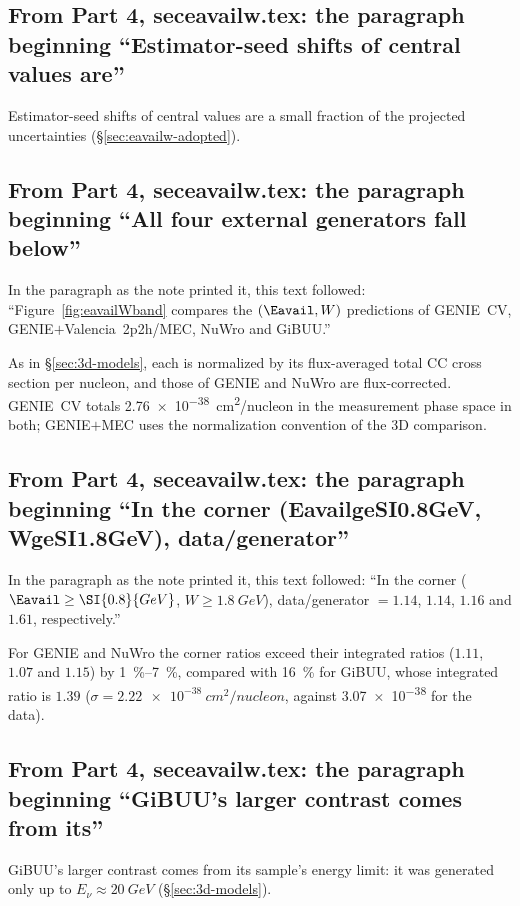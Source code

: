 \subsection{From Part 4, seceavailw.tex: the paragraph beginning ``Estimator-seed shifts of central values are''}
Estimator-seed shifts of central values are a small fraction of the projected uncertainties (\S\ref{sec:eavailw-adopted}).

\subsection{From Part 4, seceavailw.tex: the paragraph beginning ``All four external generators fall below''}
In the paragraph as the note printed it, this text followed: ``Figure~\ref{fig:eavailWband} compares the $(\Eavail,W)$ predictions of GENIE~CV, GENIE$+$Valencia~2p2h/MEC, NuWro and GiBUU.''\par
As in \S\ref{sec:3d-models}, each is normalized by its flux-averaged total CC cross section per nucleon, and those of GENIE and NuWro are flux-corrected. GENIE~CV totals \SI{2.76e-38}{cm^2/nucleon} in the measurement phase space in both; GENIE$+$MEC uses the normalization convention of the 3D comparison.

\subsection{From Part 4, seceavailw.tex: the paragraph beginning ``In the corner (EavailgeSI0.8GeV, WgeSI1.8GeV), data/generator''}
In the paragraph as the note printed it, this text followed: ``In the corner ($\Eavail\ge\SI{0.8}{GeV}$, $W\ge\SI{1.8}{GeV}$), data/generator $=1.14$, $1.14$, $1.16$ and $1.61$, respectively.''\par
For GENIE and NuWro the corner ratios exceed their integrated ratios ($1.11$, $1.07$ and $1.15$) by \SIrange{1}{7}{\percent}, compared with \SI{16}{\percent} for GiBUU, whose integrated ratio is $1.39$ ($\sigma=\SI{2.22e-38}{cm^2/nucleon}$, against \SI{3.07e-38}{} for the data).

\subsection{From Part 4, seceavailw.tex: the paragraph beginning ``GiBUU's larger contrast comes from its''}
GiBUU's larger contrast comes from its sample's energy limit: it was generated only up to $E_\nu\approx\SI{20}{GeV}$ (\S\ref{sec:3d-models}).

